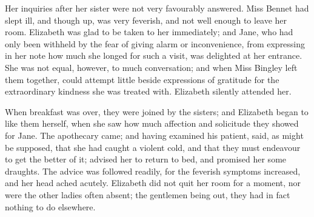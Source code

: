 Her inquiries after her sister were not very favourably answered. Miss Bennet had slept ill, and though up, was very feverish, and not well enough to leave her room. Elizabeth was glad to be taken to her immediately; and Jane, who had only been withheld by the fear of giving alarm or inconvenience, from expressing in her note how much she longed for such a visit, was delighted at her entrance. She was not equal, however, to much conversation; and when Miss Bingley left them together, could attempt little beside expressions of gratitude for the extraordinary kindness she was treated with. Elizabeth silently attended her.

When breakfast was over, they were joined by the sisters; and Elizabeth began to like them herself, when she saw how much affection and solicitude they showed for Jane. The apothecary came; and having examined his patient, said, as might be supposed, that she had caught a violent cold, and that they must endeavour to get the better of it; advised her to return to bed, and promised her some draughts. The advice was followed readily, for the feverish symptoms increased, and her head ached acutely. Elizabeth did not quit her room for a moment, nor were the other ladies often absent; the gentlemen being out, they had in fact nothing to do elsewhere.

